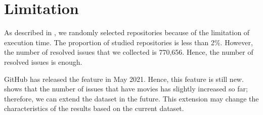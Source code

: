 \section{Limitation}
\label{sec:limitation}

As described in , we randomly selected 
repositories because of the limitation of execution time. 
The proportion of studied repositories is less than 2\%. 
However, the number of resolved issues that 
we collected is 770,656. 
Hence, the number of resolved issues is enough. 

GitHub has released the feature in May 2021. 
Hence, this feature is still new. 
 shows that the number of 
issues that have movies has slightly increased so far; 
therefore, we can extend the dataset in the future. 
This extension may change the characteristics of 
the results based on the current dataset. 
